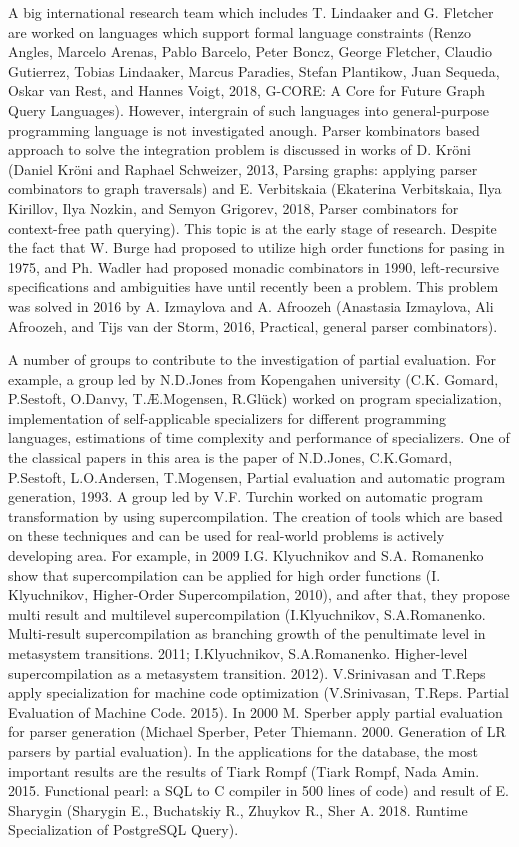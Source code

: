 \documentclass[12pt]{article}  %
\theoremstyle{remark}
\begin{document}
A big international research team which includes T. Lindaaker and G. Fletcher are worked on languages which support formal language constraints (Renzo Angles, Marcelo Arenas, Pablo Barcelo, Peter Boncz, George Fletcher, Claudio Gutierrez, Tobias Lindaaker, Marcus Paradies, Stefan Plantikow, Juan Sequeda, Oskar van Rest, and Hannes Voigt, 2018, G-CORE: A Core for Future Graph Query Languages). However, intergrain of such languages into general-purpose programming language is not investigated anough. Parser kombinators based approach to solve the integration problem is discussed in works of D.  Kröni (Daniel Kröni and Raphael Schweizer, 2013, Parsing graphs: applying parser combinators to graph traversals) and  E. Verbitskaia (Ekaterina Verbitskaia, Ilya Kirillov, Ilya Nozkin, and Semyon Grigorev, 2018, Parser combinators for context-free path querying). This topic is at the early stage of research.
Despite the fact that W. Burge had proposed to utilize high order functions for pasing in 1975, and Ph. Wadler had proposed monadic combinators in 1990, left-recursive specifications and ambiguities have until recently been a problem.
This problem was solved in 2016 by A. Izmaylova and A. Afroozeh (Anastasia Izmaylova, Ali Afroozeh, and Tijs van der Storm, 2016, Practical, general parser combinators).

A number of groups to contribute to the investigation of partial evaluation.
For example, a group led by N.D.Jones from Kopengahen university (C.K. Gomard, P.Sestoft, O.Danvy, T.Æ.Mogensen, R.Glück) worked on program specialization, implementation of self-applicable specializers for different programming languages, estimations of time complexity and performance of specializers.
One of the classical papers in this area is the paper of N.D.Jones, C.K.Gomard, P.Sestoft, L.O.Andersen, T.Mogensen,
Partial evaluation and automatic program generation, 1993.
A group led by V.F. Turchin worked on automatic program transformation by using supercompilation.
The creation of tools which are based on these techniques and can be used for real-world problems is actively developing area.
For example, in 2009 I.G. Klyuchnikov and S.A. Romanenko show that supercompilation can be applied for high order functions (I. Klyuchnikov, Higher-Order Supercompilation, 2010), and after that, they propose multi result and multilevel supercompilation
(I.Klyuchnikov, S.A.Romanenko. Multi-result supercompilation as branching growth of the penultimate level in metasystem transitions. 2011; I.Klyuchnikov, S.A.Romanenko. Higher-level supercompilation as a metasystem transition. 2012).
V.Srinivasan and T.Reps apply specialization for machine code optimization (V.Srinivasan, T.Reps. Partial Evaluation of Machine Code. 2015).
In 2000 M. Sperber apply partial evaluation for parser generation (Michael Sperber, Peter Thiemann. 2000. Generation of LR parsers by partial evaluation). In the applications for the database, the most important results are the results of Tiark Rompf (Tiark Rompf, Nada Amin. 2015. Functional pearl: a SQL to C compiler in 500 lines of code) and result of E. Sharygin (Sharygin E., Buchatskiy R., Zhuykov R., Sher A. 2018. Runtime Specialization of PostgreSQL Query).
\end{document}
